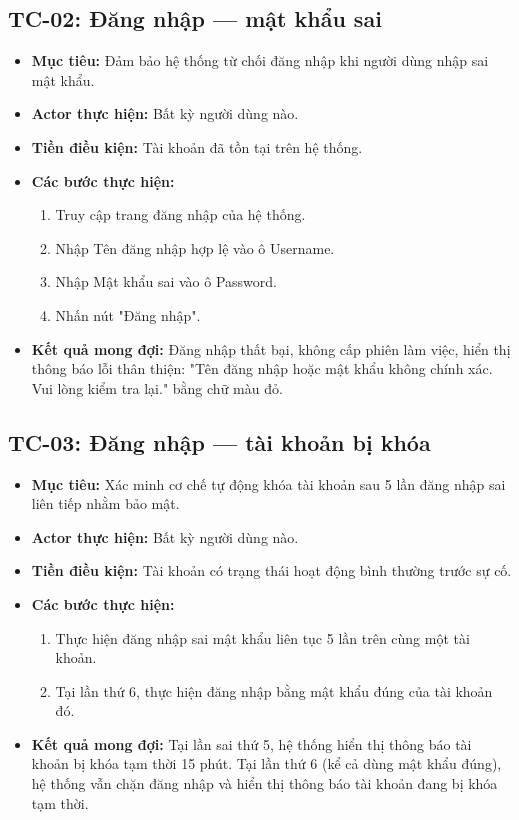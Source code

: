 \subsection{TC-02: Đăng nhập — mật khẩu sai}
\label{subsec:tc02_login_invalid_pwd}
\begin{itemize}
    \item \textbf{Mục tiêu:} Đảm bảo hệ thống từ chối đăng nhập khi người dùng nhập sai mật khẩu.
    \item \textbf{Actor thực hiện:} Bất kỳ người dùng nào.
    \item \textbf{Tiền điều kiện:} Tài khoản đã tồn tại trên hệ thống.
    \item \textbf{Các bước thực hiện:}
    \begin{enumerate}
        \item Truy cập trang đăng nhập của hệ thống.
        \item Nhập Tên đăng nhập hợp lệ vào ô Username.
        \item Nhập Mật khẩu sai vào ô Password.
        \item Nhấn nút "Đăng nhập".
    \end{enumerate}
    \item \textbf{Kết quả mong đợi:} Đăng nhập thất bại, không cấp phiên làm việc, hiển thị thông báo lỗi thân thiện: "Tên đăng nhập hoặc mật khẩu không chính xác. Vui lòng kiểm tra lại." bằng chữ màu đỏ.
\end{itemize}

\subsection{TC-03: Đăng nhập — tài khoản bị khóa}
\label{subsec:tc03_login_locked}
\begin{itemize}
    \item \textbf{Mục tiêu:} Xác minh cơ chế tự động khóa tài khoản sau 5 lần đăng nhập sai liên tiếp nhằm bảo mật.
    \item \textbf{Actor thực hiện:} Bất kỳ người dùng nào.
    \item \textbf{Tiền điều kiện:} Tài khoản có trạng thái hoạt động bình thường trước sự cố.
    \item \textbf{Các bước thực hiện:}
    \begin{enumerate}
        \item Thực hiện đăng nhập sai mật khẩu liên tục 5 lần trên cùng một tài khoản.
        \item Tại lần thứ 6, thực hiện đăng nhập bằng mật khẩu đúng của tài khoản đó.
    \end{enumerate}
    \item \textbf{Kết quả mong đợi:} Tại lần sai thứ 5, hệ thống hiển thị thông báo tài khoản bị khóa tạm thời 15 phút. Tại lần thứ 6 (kể cả dùng mật khẩu đúng), hệ thống vẫn chặn đăng nhập và hiển thị thông báo tài khoản đang bị khóa tạm thời.
\end{itemize}

